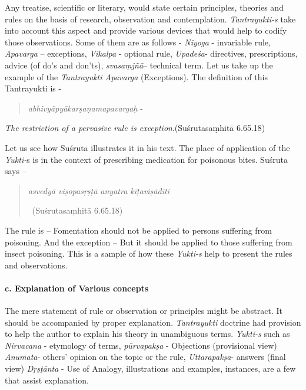 Any treatise, scientific or literary, would state certain principles, theories and rules on the basis of research, observation and contemplation. \textit{Tantrayukti-s} take into account this aspect and provide various devices that would help to codify those observations. Some of them are as follows - \textit{Niyoga} - invariable rule, \textit{Apavarga} – exceptions, \textit{Vikalpa} - optional rule, \textit{Upadeśa}- directives, prescriptions, advice (of do’s and don’ts), \textit{svasaṃjñā}– technical term. Let us take up the example of the \textit{Tantrayukti Apavarga} (Exceptions). The definition of this Tantrayukti is -

\begin{verse}
\textit{abhivyāpyākarṣaṇamapavargaḥ} -
\end{verse}

\begin{myquote}
\textit{The restriction of a pervasive rule is exception}.\hfill (Suśrutasaṃhitā 6.65.18)
\end{myquote}

Let us see how Suśruta illustrates it in his text. The place of application of the \textit{Yukti-}s is in the context of prescribing medication for poisonous bites. Suśruta says –

\begin{verse}
\textit{asvedyā viṣopasṛṣṭā anyatra kīṭaviṣāditi}

~\hfill (Suśrutasaṃhitā 6.65.18)
\end{verse}

The rule is – Fomentation should not be applied to persons suffering from poisoning. And the exception – But it should be applied to those suffering from insect poisoning. This is a sample of how these \textit{Yukti-s} help to present the rules and observations.


\paragraph*{c. Explanation of Various concepts}

The mere statement of rule or observation or principles might be abstract. It should be accompanied by proper explanation. \textit{Tantrayukti} doctrine had provision to help the author to explain his theory in unambiguous terms. \textit{Yukti-s} such as \textit{Nirvacana} - etymology of terms, \textit{pūrvapakṣa} - Objections (provisional view) \textit{Anumata}- others’ opinion on the topic or the rule, \textit{Uttarapakṣa}- answers (final view) \textit{Dṛṣṭānta} - Use of Analogy, illustrations and examples, instances, are a few that assist explanation.

